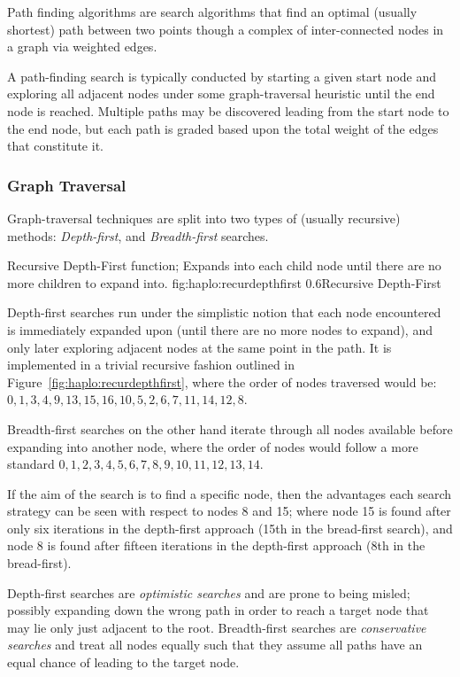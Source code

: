 Path finding algorithms are search algorithms that find an optimal (usually shortest) path between  two points though a complex of inter-connected nodes in a graph via weighted edges. 

A path-finding search is typically conducted by starting a given start node and exploring all adjacent nodes under some graph-traversal heuristic until the end node is reached. Multiple paths may be discovered leading from the start node to the end node, but each path is graded based upon the total weight of the edges that constitute it.

\subsubsection{Graph Traversal}\label{ref:haplo:graphtrav}
Graph-traversal techniques are split into two types of (usually recursive) methods: \textit{Depth-first}, and \textit{Breadth-first} searches.

	{Recursive Depth-First function; Expands into each child node until there are no more children to expand into.}
	{fig:haplo:recurdepthfirst}
	{0.6}{Recursive Depth-First}

Depth-first searches run under the simplistic notion that each node encountered is immediately expanded upon (until there are no more nodes to expand), and only later exploring adjacent nodes at the same point in the path. It is implemented in a trivial recursive fashion outlined in Figure~\ref{fig:haplo:recurdepthfirst}, where the order of nodes traversed would be: ${0,1,3,4,9,13,15,16,10,5,2,6,7,11,14,12,8}$.

Breadth-first searches on the other hand iterate through all nodes available before expanding into another node, where the order of nodes would follow a more standard ${0,1,2,3,4,5,6,7,8,9,10,11,12,13,14}$.

If the aim of the search is to find a specific node, then the advantages each search strategy can be seen with respect to nodes 8 and 15; where node 15 is found after only six iterations in the depth-first approach (15th in the bread-first search), and node 8 is found after fifteen iterations in the depth-first approach (8th in the bread-first).

Depth-first searches are \textit{optimistic searches} and are prone to being misled; possibly expanding down the wrong path in order to reach a target node that may lie only just adjacent to the root.  Breadth-first searches are \textit{conservative searches} and treat all nodes equally such that they assume all paths have an equal chance of leading to the target node. 

